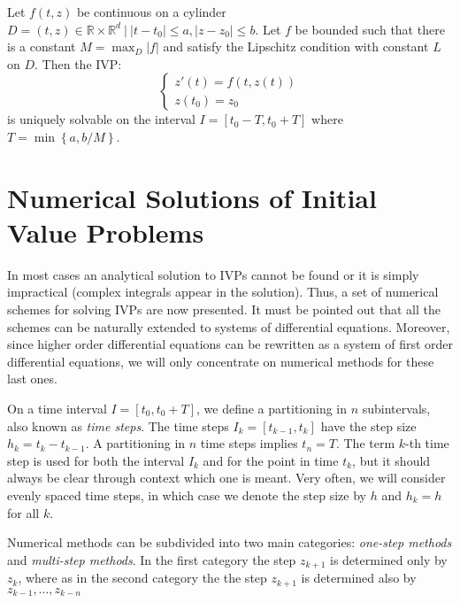 \begin{theorem}
	Let $f(t,z)$ be continuous on a cylinder
	$D = {(t,z) \in \mathbb{R} \times \mathbb{R}^d ~ \big| ~ |t-t_0| \leq a, |z-z_0| \leq b}$.
	Let $f$ be bounded such that there is a constant
	$M = \max_{D} |f|$ and satisfy the 
	Lipschitz condition with constant $L$ on $D$. Then the IVP:
	\begin{equation}
	\begin{cases}
		z'(t) = f(t,z(t)) \\
		z(t_0) = z_0
	\end{cases}
	\end{equation}
	is uniquely solvable on the interval
	$I = [t_0-T, t_0+T]$ where $T = \min\left\lbrace a, b/M \right\rbrace$.
\end{theorem}

\section{Numerical Solutions of Initial Value Problems}

In most cases an analytical solution to IVPs cannot be found or 
it is simply impractical (complex integrals appear in the solution).
Thus, a set of numerical schemes for solving IVPs are now presented.
It must be pointed out that all the schemes can be naturally extended
to systems of differential equations.
Moreover, since higher order differential equations can be
rewritten as a system of first order differential equations,
we will only concentrate on numerical methods for these last ones.

\begin{definition}
On a time interval $I = [t_0,t_0+T]$, we define a partitioning in $n$ subintervals,
also known as \textit{time steps}.
The time steps $I_k=[t_{k-1}, t_k]$ have the step size $h_k = t_k - t_{k-1}$.
A partitioning in $n$ time steps implies $t_n = T$.
The term $k$-th time step is used for both the interval $I_k$
and for the point in time $t_k$, but it should always be clear
through context which one is meant.
Very often, we will consider evenly spaced time steps,
in which case we denote the step size by $h$ and $h_k = h$ for all $k$.
\end{definition}

Numerical methods can be subdivided into two main categories:
\textit{one-step methods} and \textit{multi-step methods}.
In the first category the step $z_{k+1}$ is determined only
by $z_{k}$, where as in the second category the the step
$z_{k+1}$ is determined also by $z_{k-1},\dots,z_{k-n}$


